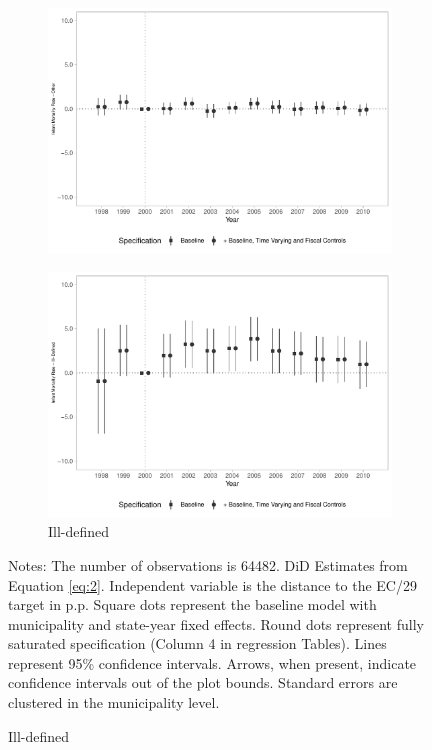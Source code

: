 \begin{figure}[h!]
\begin{center}
\begin{subfigure}{0.32\textwidth}
        \includegraphics[width=\textwidth]{plots/tx_mi_out_dist_ec29_baseline_dist_ec29_baseline_17.pdf}
    \end{subfigure}
        \begin{subfigure}{0.32\textwidth}
        \centering
        \caption{\scriptsize Ill-defined}\label{fig:17h}
        \includegraphics[width=\textwidth]{plots/tx_mi_illdef_dist_ec29_baseline_dist_ec29_baseline_17.pdf}
    \end{subfigure}
    \end{center}
    
            \scriptsize{Notes: The number of observations is 64482. DiD Estimates from Equation \ref{eq:2}. Independent variable is the distance to the EC/29 target in p.p. Square dots represent the baseline model with municipality and state-year fixed effects. Round dots represent fully saturated specification (Column 4 in regression Tables). Lines represent 95\% confidence intervals. Arrows, when present, indicate confidence intervals out of the plot bounds. Standard errors are clustered in the municipality level.}
    
\end{figure}
